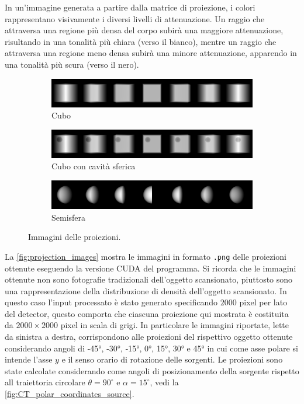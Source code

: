 \documentclass[12pt,a4paper]{report}
\begin{document}
In un'immagine generata a partire dalla matrice di proiezione, i colori rappresentano visivamente i diversi livelli di
attenuazione.
Un raggio che attraversa una regione più densa del corpo subirà una maggiore attenuazione, risultando in una tonalità più chiara
(verso il bianco), mentre un raggio che attraversa una regione meno densa subirà una minore attenuazione, apparendo in una
tonalità più scura (verso il nero).

\begin{figure}[H]
  \centering
  \begin{subfigure}{0.9\textwidth}
    \centering
    \includegraphics[width=\textwidth]{Cube}
    \caption{Cubo}
  \end{subfigure}
  \begin{subfigure}{0.9\textwidth}
    \centering
    \includegraphics[width=\textwidth]{CubeWithSphericalHole}
    \caption{Cubo con cavità sferica}
  \end{subfigure}
  \begin{subfigure}{0.9\textwidth}
    \centering
    \includegraphics[width=\textwidth]{HalfSphere}
    \caption{Semisfera}
  \end{subfigure}
  \caption{\label{fig:projection_images} Immagini delle proiezioni.}
\end{figure}

La \autoref{fig:projection_images} mostra le immagini in formato \lstinline{.png} delle proiezioni ottenute eseguendo la versione
CUDA del programma.
Si ricorda che le immagini ottenute non sono fotografie tradizionali dell'oggetto scansionato, piuttosto sono una rappresentazione
della distribuzione di densità dell'oggetto scansionato.
In questo caso l'input processato è stato generato specificando \(2000\) pixel per lato del detector, questo comporta che
ciascuna proiezione qui mostrata è costituita da \(2000 \times 2000\) pixel in scala di grigi.
In particolare le immagini riportate, lette da sinistra a destra, corrispondono alle proiezioni del rispettivo oggetto ottenute
considerando angoli di -45°, -30°, -15°, 0°, 15°, 30° e 45° in cui come asse polare si intende l'asse \(y\) e il senso orario di
rotazione delle sorgenti.
Le proiezioni sono state calcolate considerando come angoli di posizionamento della sorgente rispetto all traiettoria circolare
\(\theta = 90^\circ\) e \(\alpha = 15^\circ\), vedi la \autoref{fig:CT_polar_coordinates_source}.
\end{document}
